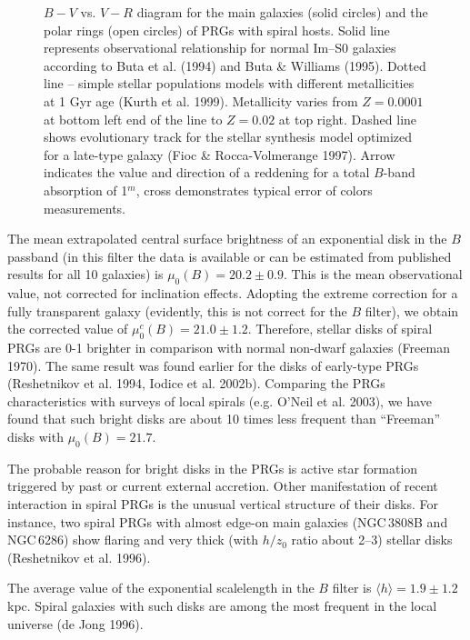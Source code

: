 \documentclass[]{aa}
\begin{document}
\begin{figure}
\centerline{}
\caption{$B-V$ vs. $V-R$ diagram for the main galaxies (solid circles) 
and the polar rings (open circles) of PRGs with spiral hosts. Solid
line represents observational relationship for normal Im--S0 galaxies
according to Buta et al. (1994) and Buta \& Williams (1995).
Dotted line -- simple stellar populations models with different
metallicities at 1 Gyr age (Kurth et al. 1999). Metallicity varies
from $Z=0.0001$ at bottom left end of the line to $Z=0.02$ at top 
right. Dashed line shows evolutionary track for the stellar
synthesis model optimized for a late-type galaxy 
(Fioc \& Rocca-Volmerange 1997). 
Arrow indicates the value and direction of a reddening
for a total $B$-band absorption of 1$^m$, cross demonstrates typical
error of colors measurements.}
\end{figure}

The mean extrapolated central surface brightness of an exponential disk
in the $B$ passband (in this filter the data is available or can be estimated
from published results for all 10 galaxies) is 
$\mu_0(B)=20.2 \pm 0.9$. This is the mean observational value, not corrected
for inclination effects. Adopting the extreme correction for a fully transparent
galaxy (evidently, this is not correct for the $B$ filter), we obtain
the corrected value of $\mu^c_0(B)=21.0 \pm 1.2$. Therefore, stellar 
disks of spiral PRGs are 0-1 brighter in comparison with  
normal non-dwarf galaxies (Freeman 1970). The same result was found
earlier for the disks of early-type PRGs (Reshetnikov et al. 1994,
Iodice et al. 2002b). Comparing the PRGs characteristics with 
surveys of local spirals (e.g. O'Neil et al. 2003), we have found that such
bright disks are about 10 times less frequent than ``Freeman'' disks
with $\mu_0(B)=21.7$. 

The probable reason for bright disks in the PRGs
is active star formation triggered by past or current external 
accretion. Other manifestation of recent interaction in spiral
PRGs is the unusual vertical structure of their disks. For instance,
two spiral PRGs with almost edge-on main galaxies (NGC\,3808B and
NGC\,6286) show flaring and very thick (with $h/z_0$ ratio about 2--3)
stellar disks (Reshetnikov et al. 1996).

The average value of the exponential scalelength in the $B$ filter is 
$\langle h \rangle = 1.9 \pm 1.2$ kpc. Spiral galaxies with such
disks are among the most frequent in the local universe
(de Jong 1996).
\end{document}
